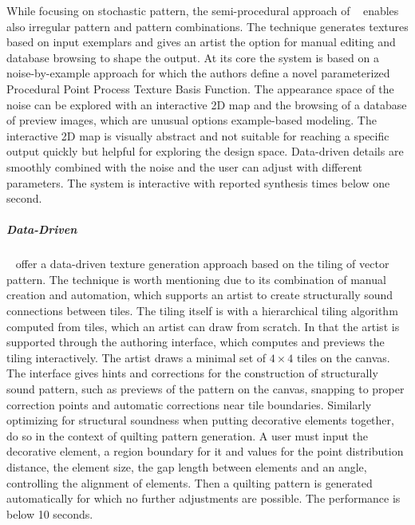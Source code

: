 While focusing on stochastic pattern, the semi-procedural approach of \citeauthor*{guehl_2020_stu}~\cite{guehl_2020_stu} enables also irregular pattern and pattern combinations. The technique
generates textures based on input exemplars and gives an artist the option for manual editing and database browsing to shape the output. At its core the system is based on a noise-by-example approach for which the authors define a novel parameterized Procedural Point Process Texture Basis Function. The appearance space of the noise can be explored with an interactive 2D map and the browsing of a database of preview images, which are unusual options example-based modeling. The interactive 2D map is visually abstract and not suitable for reaching a specific output quickly but helpful for exploring the design space. Data-driven details are smoothly combined with the noise and the user can adjust with different parameters. The system is interactive with reported synthesis times below one second.


\subparagraph*{Data-Driven}
\label{subpara:analysis_regular_tilings}

\citeauthor*{bian_2018_tpd}~\cite{bian_2018_tpd} offer a data-driven texture generation approach based on the tiling of vector pattern. The technique is worth mentioning due to its combination of manual creation and automation, which supports an artist to create structurally sound connections between tiles. The tiling itself is with a hierarchical tiling algorithm computed from tiles, which an artist can draw from scratch. In that the artist is supported through the authoring interface, which computes and previews the tiling interactively. The artist draws a minimal set of $4\times4$ tiles on the canvas. The interface gives hints and corrections for the construction of structurally sound pattern, such as previews of the pattern on the canvas, snapping to proper correction points and automatic corrections near tile boundaries. Similarly optimizing for structural soundness when putting decorative elements together,~\citeauthor*{li_2019_aqp}~\cite{li_2019_aqp} do so in the context of quilting pattern generation. A user must input the decorative element, a region boundary for it and values for the point distribution distance, the element size, the gap length between elements and an angle, controlling the alignment of elements. Then a quilting pattern is generated automatically for which no further adjustments are possible. The performance is below 10 seconds.

